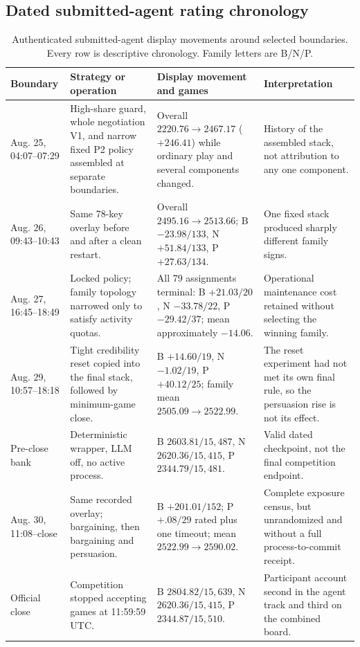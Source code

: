 \subsection{Dated submitted-agent rating chronology}

\begin{table}[h]
\centering
\small
\caption{Authenticated submitted-agent display movements around selected boundaries.
Every row is descriptive chronology. Family letters are B/N/P.}
\label{tab:rating_chronology}
\begin{tabularx}{\linewidth}{@{}p{2.25cm}p{3.25cm}p{4.4cm}Y@{}}
\toprule
Boundary & Strategy or operation & Display movement and games & Interpretation \\
\midrule
Aug. 25, 04:07--07:29 & High-share guard, whole negotiation V1, and narrow fixed P2 policy assembled at separate boundaries. & Overall $2220.76\rightarrow2467.17$ ($+246.41$) while ordinary play and several components changed. & History of the assembled stack, not attribution to any one component. \\
Aug. 26, 09:43--10:43 & Same 78-key overlay before and after a clean restart. & Overall $2495.16\rightarrow2513.66$; B $-23.98/133$, N $+51.84/133$, P $+27.63/134$. & One fixed stack produced sharply different family signs. \\
Aug. 27, 16:45--18:49 & Locked policy; family topology narrowed only to satisfy activity quotas. & All 79 assignments terminal: B $+21.03/20$, N $-33.78/22$, P $-29.42/37$; mean approximately $-14.06$. & Operational maintenance cost retained without selecting the winning family. \\
Aug. 29, 10:57--18:18 & Tight credibility reset copied into the final stack, followed by minimum-game close. & B $+14.60/19$, N $-1.02/19$, P $+40.12/25$; family mean $2505.09\rightarrow2522.99$. & The reset experiment had not met its own final rule, so the persuasion rise is not its effect. \\
Pre-close bank & Deterministic wrapper, LLM off, no active process. & B $2603.81/15{,}487$, N $2620.36/15{,}415$, P $2344.79/15{,}481$. & Valid dated checkpoint, not the final competition endpoint. \\
Aug. 30, 11:08--close & Same recorded overlay; bargaining, then bargaining and persuasion. & B $+201.01/152$; P $+.08/29$ rated plus one timeout; mean $2522.99\rightarrow2590.02$. & Complete exposure census, but unrandomized and without a full process-to-commit receipt. \\
Official close & Competition stopped accepting games at 11:59:59 UTC. & B $2804.82/15{,}639$, N $2620.36/15{,}415$, P $2344.87/15{,}510$. & Participant account second in the agent track and third on the combined board. \\
\bottomrule
\end{tabularx}
\end{table}

